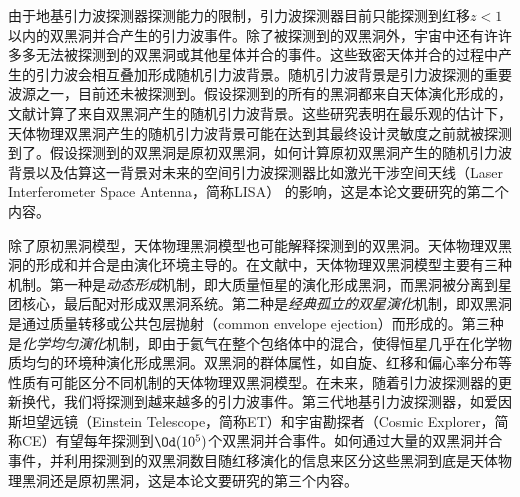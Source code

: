 由于地基引力波探测器探测能力的限制，\lvc 引力波探测器目前只能探测到红移$z<1$以内的双黑洞并合产生的引力波事件\citep{TheLIGOScientific:2016htt,Aasi:2013wya}。除了被\lvc 探测到的双黑洞外，宇宙中还有许许多多无法被\lvc 探测到的双黑洞或其他星体并合的事件。这些致密天体并合的过程中产生的引力波会相互叠加形成随机引力波背景\citep{Christensen:1992wi}。随机引力波背景是引力波探测的重要波源之一，目前还未被探测到。假设\lvc 探测到的所有的黑洞都来自天体演化形成的\citep{Belczynski:2010tb,Miller:2016krr,TheLIGOScientific:2016htt,Belczynski:2016obo,Stevenson:2017tfq}，文献\citep{TheLIGOScientific:2016wyq,TheLIGOScientific:2016dpb}计算了来自双黑洞产生的随机引力波背景。这些研究表明在最乐观的估计下，天体物理双黑洞产生的随机引力波背景可能在\lvc 达到其最终设计灵敏度之前就被探测到了。假设\lvc 探测到的双黑洞是原初双黑洞，如何计算原初双黑洞产生的随机引力波背景以及估算这一背景对未来的空间引力波探测器比如激光干涉空间天线（Laser Interferometer Space Antenna，简称LISA） \citep{Audley:2017drz}的影响，这是本论文要研究的第二个内容。


除了原初黑洞模型，天体物理黑洞模型也可能解释\lvc 探测到的双黑洞。天体物理双黑洞的形成和并合是由演化环境主导的。在文献中，天体物理双黑洞模型主要有三种机制。第一种是\textit{动态形成}机制，即大质量恒星的演化形成黑洞，而黑洞被分离到星团核心，最后配对形成双黑洞系统\citep{Rodriguez:2015oxa,Rodriguez:2016kxx,Park:2017zgj}。第二种是\textit{经典孤立的双星演化}机制，即双黑洞是通过质量转移或公共包层抛射（common envelope ejection）而形成的\citep{Belczynski:2014iua,Belczynski:2016obo,Woosley:2016nnw,Rodriguez:2018rmd,Choksi:2018jnq}。第三种是\textit{化学均匀演化}机制，即由于氦气在整个包络体中的混合\citep{2010AIPC.1314..291D,deMink:2016vkw}，使得恒星几乎在化学物质均匀的环境种演化形成黑洞。双黑洞的群体属性，如自旋\citep{Farr:2017uvj,Tiwari:2018qch,Ng:2018neg,Stevenson:2017dlk,Bogomazov:2018prw,Lopez:2018nkj,Sedda:2018nxm,Farr:2017gtv}、红移\citep{Fishbach:2018edt,Emami:2018taj,Bai:2018shq}和偏心率分布\citep{Samsing:2013kua,Samsing:2017xmd,Samsing:2017jnz,Lower:2018seu}等性质有可能区分不同机制的天体物理双黑洞模型。在未来，随着引力波探测器的更新换代，我们将探测到越来越多的引力波事件。第三代地基引力波探测器，如爱因斯坦望远镜（Einstein Telescope，简称ET）\citep{Punturo:2010zz}和宇宙勘探者（Cosmic Explorer，简称CE）\citep{Evans:2016mbw}有望每年探测到$\Od(10^5)$\citep{Regimbau:2016ike,Vitale:2018yhm}个双黑洞并合事件。如何通过大量的双黑洞并合事件，并利用探测到的双黑洞数目随红移演化的信息来区分这些黑洞到底是天体物理黑洞还是原初黑洞，这是本论文要研究的第三个内容。

